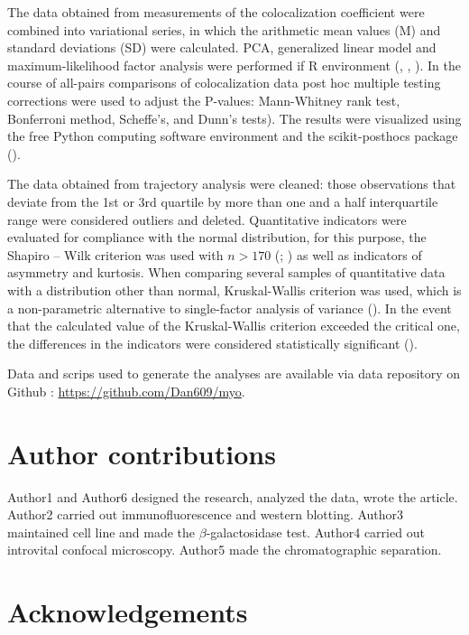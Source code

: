 \documentclass[alpha-refs]{wiley-article}
\begin{document}
The data obtained from measurements of the colocalization coefficient were combined into variational series, in which the arithmetic mean values (M) and standard deviations (SD) were calculated.
PCA, generalized linear model and maximum-likelihood factor analysis were performed if R environment (\cite{husson2010exploratory}, \cite{dobson2008introduction}, \cite{lawley1971factor}).
In the course of all-pairs comparisons of colocalization data post hoc multiple testing corrections were used to adjust the P-values: Mann-Whitney rank test, Bonferroni method, Scheffe’s, and Dunn’s tests).
The results were visualized using the free Python computing software environment and the scikit-posthocs package (\cite{Terpilowski2019}).


The data obtained from trajectory analysis were cleaned: those observations that deviate from the 1st or 3rd quartile by more than one and a half interquartile range were considered outliers and deleted.
Quantitative indicators were evaluated for compliance with the normal distribution, for this purpose, the Shapiro – Wilk criterion  was used with $n > 170$ (\cite{shapiro1965analysis}; \cite{shapiro1972approximate}) as well as indicators of asymmetry and kurtosis.
When comparing several samples of quantitative data with a distribution other than normal, Kruskal-Wallis criterion was used, which is a non-parametric alternative to single-factor analysis of variance (\cite{kruskal1952use}).
In the event that the calculated value of the Kruskal-Wallis criterion exceeded the critical one, the differences in the indicators were considered statistically significant (\cite{wilcoxon1992individual}).

Data and scrips used to generate the analyses are available via data repository on Github : \url{https://github.com/Dan609/myo}.


\section*{Author contributions}

Author1 and Author6 designed the research, analyzed the data, wrote the article.
Author2 carried out immunofluorescence and western blotting.
Author3 maintained cell line and made the $\beta$-galactosidase test.
Author4 carried out introvital confocal microscopy.
Author5 made the chromatographic separation.

\section*{Acknowledgements}
\end{document}
